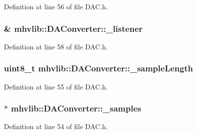 Definition at line 56 of file D\-A\-C.\-h.

\hypertarget{classmhvlib_1_1_d_a_converter_a725df29706b256a56547ac94ea07b4e1}{
\subsubsection[{\-\_\-listener}]{\& mhvlib\-::\-D\-A\-Converter\-::\-\_\-listener\hspace{0.3cm}{\ttfamily [protected]}}}\label{classmhvlib_1_1_d_a_converter_a725df29706b256a56547ac94ea07b4e1}


Definition at line 58 of file D\-A\-C.\-h.

\hypertarget{classmhvlib_1_1_d_a_converter_ac9a869f3b29b868bf0f841a34bbee38c}{
\subsubsection[{\-\_\-sample\-Length}]{\setlength{\rightskip}{0pt plus 5cm}uint8\-\_\-t mhvlib\-::\-D\-A\-Converter\-::\-\_\-sample\-Length\hspace{0.3cm}{\ttfamily [protected]}}}\label{classmhvlib_1_1_d_a_converter_ac9a869f3b29b868bf0f841a34bbee38c}


Definition at line 55 of file D\-A\-C.\-h.

\hypertarget{classmhvlib_1_1_d_a_converter_af172d959041b8b868c3ba3f5ad00db93}{
\subsubsection[{\-\_\-samples}]{$\ast$ mhvlib\-::\-D\-A\-Converter\-::\-\_\-samples\hspace{0.3cm}{\ttfamily [protected]}}}\label{classmhvlib_1_1_d_a_converter_af172d959041b8b868c3ba3f5ad00db93}


Definition at line 54 of file D\-A\-C.\-h.

